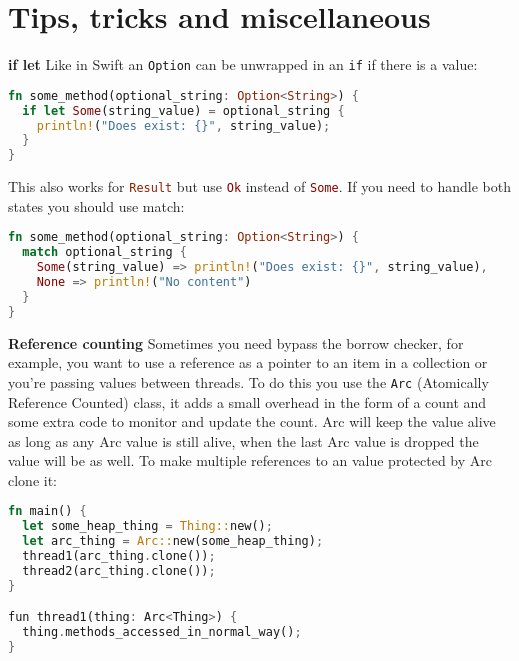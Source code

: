 \documentclass[a4paper,11pt]{article}
\begin{document}
\newpage
\section{Tips, tricks and miscellaneous}

\textbf{if let}
\newline
Like in Swift an \lstinline[language=Kotlin]{Option} can be unwrapped in an \lstinline|if| if there is a value:

\begin{lstlisting}[language=Rust,frame=single]
fn some_method(optional_string: Option<String>) {
  if let Some(string_value) = optional_string {
    println!("Does exist: {}", string_value);
  }
}
\end{lstlisting}

This also works for \lstinline[language=Rust]{Result} but use \lstinline[language=Rust]{Ok} instead of \lstinline[language=Rust]{Some}. If you need to handle both states you should use match:
\begin{lstlisting}[language=Rust,frame=single]
fn some_method(optional_string: Option<String>) {
  match optional_string {
    Some(string_value) => println!("Does exist: {}", string_value),
    None => println!("No content")
  }
}
\end{lstlisting}
\medskip
\textbf{Reference counting}
\newline
Sometimes you need bypass the borrow checker, for example, you want to use a reference as a pointer to an item in a collection or you're passing values between threads. To do this you use the \lstinline[language=Rust]{Arc} (Atomically Reference Counted) class, it adds a small overhead in the form of a count and some extra code to monitor and update the count. Arc will keep the value alive as long as any Arc value is still alive, when the last Arc value is dropped the value will be as well. To make multiple references to an value protected by Arc clone it:
\begin{lstlisting}[language=Rust,frame=single]
fn main() {
  let some_heap_thing = Thing::new();
  let arc_thing = Arc::new(some_heap_thing);
  thread1(arc_thing.clone()); 
  thread2(arc_thing.clone()); 
}

fun thread1(thing: Arc<Thing>) {
  thing.methods_accessed_in_normal_way();
}
\end{lstlisting}
\end{document}

